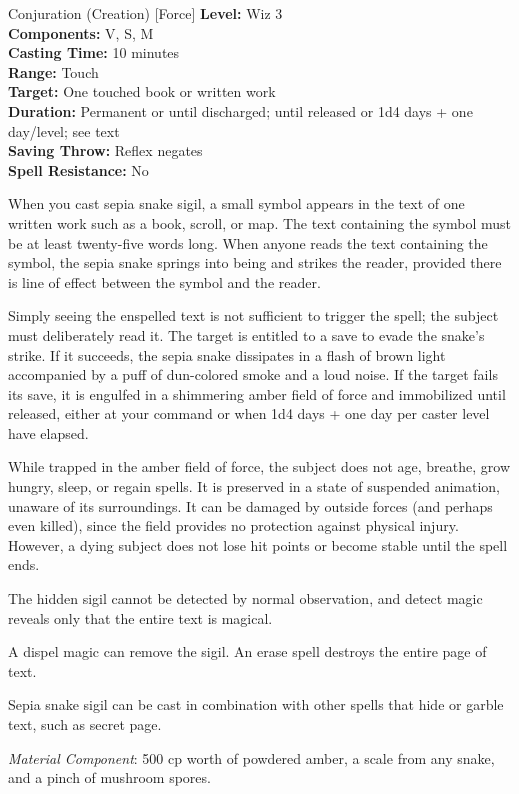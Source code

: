 {Conjuration (Creation) [Force]}
{
	\textbf{Level:}
	Wiz 3\\
	\textbf{Components:}
	V, S, M\\
	\textbf{Casting Time:}
	10 minutes\\
	\textbf{Range:}
	Touch\\
	\textbf{Target:}
	One touched book or written work\\
	\textbf{Duration:}
	Permanent or until discharged; until released or 1d4 days + one day/level; see text\\
	\textbf{Saving Throw:}
	Reflex negates\\
	\textbf{Spell Resistance:}
	No\\
}
{
	When you cast sepia snake sigil, a small symbol appears in the text of one written work such as a book, scroll, or map. The text containing the symbol must be at least twenty-five words long. When anyone reads the text containing the symbol, the sepia snake springs into being and strikes the reader, provided there is line of effect between the symbol and the reader.

	Simply seeing the enspelled text is not sufficient to trigger the spell; the subject must deliberately read it. The target is entitled to a save to evade the snake's strike. If it succeeds, the sepia snake dissipates in a flash of brown light accompanied by a puff of dun-colored smoke and a loud noise. If the target fails its save, it is engulfed in a shimmering amber field of force and immobilized until released, either at your command or when 1d4 days + one day per caster level have elapsed.

	While trapped in the amber field of force, the subject does not age, breathe, grow hungry, sleep, or regain spells. It is preserved in a state of suspended animation, unaware of its surroundings. It can be damaged by outside forces (and perhaps even killed), since the field provides no protection against physical injury. However, a dying subject does not lose hit points or become stable until the spell ends.

	The hidden sigil cannot be detected by normal observation, and detect magic reveals only that the entire text is magical.

	A dispel magic can remove the sigil. An erase spell destroys the entire page of text.

	Sepia snake sigil can be cast in combination with other spells that hide or garble text, such as secret page.

	\textit{Material Component}:
	500 cp worth of powdered amber, a scale from any snake, and a pinch of mushroom spores.

}
